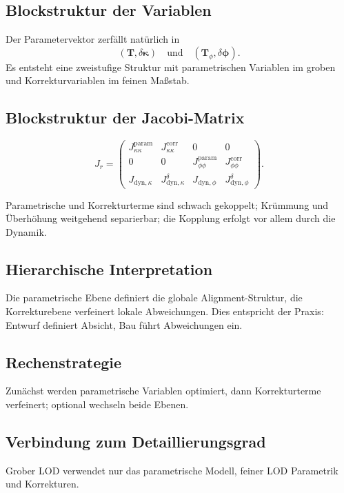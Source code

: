 \subsection{Blockstruktur der Variablen}
Der Parametervektor zerfällt natürlich in
\[
(\mathbf T,\delta\boldsymbol\kappa)
\quad\text{und}\quad
(\mathbf T_\phi,\delta\boldsymbol\phi).
\]
Es entsteht eine zweistufige Struktur mit parametrischen Variablen im groben
und Korrekturvariablen im feinen Maßstab.

\subsection{Blockstruktur der Jacobi-Matrix}
\begin{definition}
\[
J_r=\begin{pmatrix}
J_{\kappa\kappa}^{\mathrm{param}}&J_{\kappa\kappa}^{\mathrm{corr}}&0&0\\
0&0&J_{\phi\phi}^{\mathrm{param}}&J_{\phi\phi}^{\mathrm{corr}}\\
J_{\mathrm{dyn},\kappa}&J_{\mathrm{dyn},\kappa}^{\delta}&
J_{\mathrm{dyn},\phi}&J_{\mathrm{dyn},\phi}^{\delta}
\end{pmatrix}.
\]
\end{definition}
Parametrische und Korrekturterme sind schwach gekoppelt; Krümmung und
Überhöhung weitgehend separierbar; die Kopplung erfolgt vor allem durch die
Dynamik.

\subsection{Hierarchische Interpretation}
Die parametrische Ebene definiert die globale Alignment-Struktur, die
Korrekturebene verfeinert lokale Abweichungen. Dies entspricht der Praxis:
Entwurf definiert Absicht, Bau führt Abweichungen ein.

\subsection{Rechenstrategie}
Zunächst werden parametrische Variablen optimiert, dann Korrekturterme
verfeinert; optional wechseln beide Ebenen.

\subsection{Verbindung zum Detaillierungsgrad}
Grober LOD verwendet nur das parametrische Modell, feiner LOD Parametrik und
Korrekturen.


